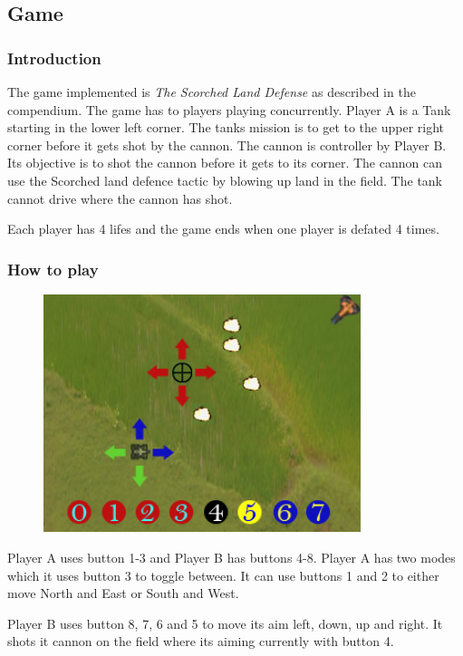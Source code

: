 \subsection{Game}

\subsubsection{Introduction}
The game implemented is {\it The Scorched Land Defense} as described in the compendium. The game has
to players playing concurrently. Player A is a Tank starting in the lower left corner. The tanks
mission is to get to the upper right corner before it gets shot by the cannon. The cannon is
controller by Player B. Its objective is to shot the cannon before it gets to its corner. The cannon
can use the Scorched land defence tactic by blowing up land in the field. The tank cannot drive
where the cannon has shot.

Each player has 4 lifes and the game ends when one player is defated 4 times.

\subsubsection{How to play}

\begin{figure}[h]
  \includegraphics[width=350px]{graphics/buttons_illustration.jpg}

\end{figure}

Player A uses button 1-3 and Player B has buttons 4-8. Player A has two modes which it uses button 3
to toggle between. It can use buttons 1 and 2 to either move North and East or South and West.

Player B uses button 8, 7, 6 and 5 to move its aim left, down, up and right. It shots it cannon on
the field where its aiming currently with button 4.

